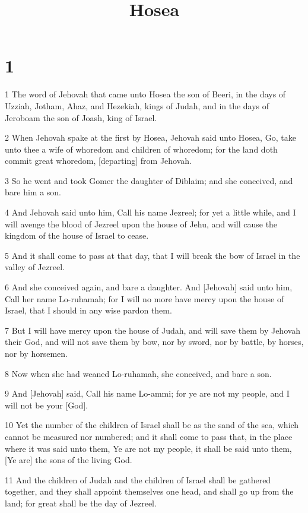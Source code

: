 

\title{Hosea}

\chapter{1}

\par 1 The word of Jehovah that came unto Hosea the son of Beeri, in the days of Uzziah, Jotham, Ahaz, and Hezekiah, kings of Judah, and in the days of Jeroboam the son of Joash, king of Israel.
\par 2 When Jehovah spake at the first by Hosea, Jehovah said unto Hosea, Go, take unto thee a wife of whoredom and children of whoredom; for the land doth commit great whoredom, [departing] from Jehovah.
\par 3 So he went and took Gomer the daughter of Diblaim; and she conceived, and bare him a son.
\par 4 And Jehovah said unto him, Call his name Jezreel; for yet a little while, and I will avenge the blood of Jezreel upon the house of Jehu, and will cause the kingdom of the house of Israel to cease.
\par 5 And it shall come to pass at that day, that I will break the bow of Israel in the valley of Jezreel.
\par 6 And she conceived again, and bare a daughter. And [Jehovah] said unto him, Call her name Lo-ruhamah; for I will no more have mercy upon the house of Israel, that I should in any wise pardon them.
\par 7 But I will have mercy upon the house of Judah, and will save them by Jehovah their God, and will not save them by bow, nor by sword, nor by battle, by horses, nor by horsemen.
\par 8 Now when she had weaned Lo-ruhamah, she conceived, and bare a son.
\par 9 And [Jehovah] said, Call his name Lo-ammi; for ye are not my people, and I will not be your [God].
\par 10 Yet the number of the children of Israel shall be as the sand of the sea, which cannot be measured nor numbered; and it shall come to pass that, in the place where it was said unto them, Ye are not my people, it shall be said unto them, [Ye are] the sons of the living God.
\par 11 And the children of Judah and the children of Israel shall be gathered together, and they shall appoint themselves one head, and shall go up from the land; for great shall be the day of Jezreel.

